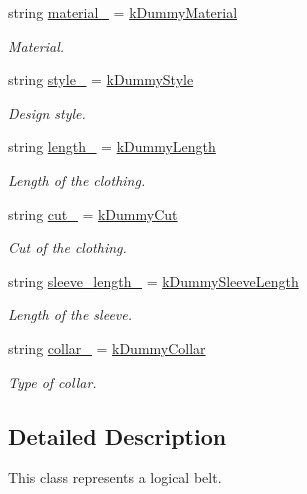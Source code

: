\begin{DoxyCompactItemize}
string \mbox{\hyperlink{classClothes_adbb9ed311f14ccbb1e4fe0e8378a95d4}{material\+\_\+}} = \mbox{\hyperlink{clothes_8h_a9df1268c6668ae4e2a728ccf032cc33d}{k\+Dummy\+Material}}
\begin{DoxyCompactList}\small\item\em Material. \end{DoxyCompactList}\item 
string \mbox{\hyperlink{classClothes_aa85ed2b95110d8c477a1aca9cb403f98}{style\+\_\+}} = \mbox{\hyperlink{clothes_8h_a9deec6ed1f40928bfa0040eeab95ed6b}{k\+Dummy\+Style}}
\begin{DoxyCompactList}\small\item\em Design style. \end{DoxyCompactList}\item 
string \mbox{\hyperlink{classClothes_ae02603eda727e33caf46ec30e761e3c3}{length\+\_\+}} = \mbox{\hyperlink{clothes_8h_a1624256dcecfb0995a74c36142593770}{k\+Dummy\+Length}}
\begin{DoxyCompactList}\small\item\em Length of the clothing. \end{DoxyCompactList}\item 
string \mbox{\hyperlink{classClothes_ac1c2286c8928a5eee91d818a098a44ac}{cut\+\_\+}} = \mbox{\hyperlink{clothes_8h_a8a6eb066049b009439505355aeaae375}{k\+Dummy\+Cut}}
\begin{DoxyCompactList}\small\item\em Cut of the clothing. \end{DoxyCompactList}\item 
string \mbox{\hyperlink{classClothes_a012aeb71e62ebaf9b5b5dd700cc8d5db}{sleeve\+\_\+length\+\_\+}} = \mbox{\hyperlink{clothes_8h_a0f53dde6a2c4c344bb7da50655497350}{k\+Dummy\+Sleeve\+Length}}
\begin{DoxyCompactList}\small\item\em Length of the sleeve. \end{DoxyCompactList}\item 
string \mbox{\hyperlink{classClothes_ae2e5026257b3a2f2ddbf61757fd3b57b}{collar\+\_\+}} = \mbox{\hyperlink{clothes_8h_ac06c9f556f68bcd2829e36c55b70a86e}{k\+Dummy\+Collar}}
\begin{DoxyCompactList}\small\item\em Type of collar. \end{DoxyCompactList}\end{DoxyCompactItemize}


\subsection{Detailed Description}
This class represents a logical belt. 

